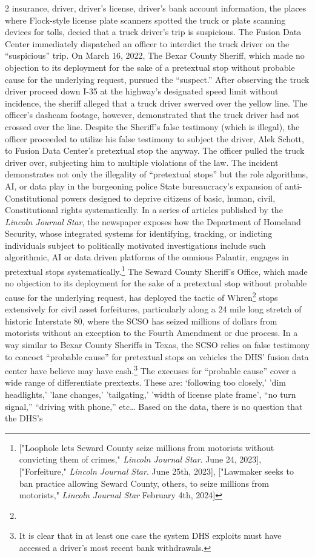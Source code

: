 \documentclass[10pt,a4paper,twoside]{article} %
\begin{document}
\begin{multicols}{2}
insurance, driver, driver’s license, driver’s bank account information, the places where Flock-style license plate scanners spotted the truck or plate scanning devices for tolls, decied that a truck driver’s trip is suspicious. The Fusion Data Center immediately dispatched an officer to interdict the truck driver on the “suspicious” trip. On March 16, 2022, The Bexar County Sheriff, which made no objection to its deployment for the sake of a pretextual stop without probable cause for the underlying request, pursued the “suspect.”  After observing the truck driver proceed down I-35 at the highway’s designated speed limit without incidence, the sheriff alleged that a truck driver swerved over the yellow line. The officer’s dashcam footage, however, demonstrated that the truck driver had not crossed over the line. Despite the Sheriff’s false testimony (which is illegal), the officer proceeded to utilize his false testimony to subject the driver, Alek Schott, to Fusion Data Center’s pretextual stop the anyway. The officer pulled the truck driver over, subjecting him to multiple violations of the law. The incident demonstrates not only the illegality of “pretextual stops” but the role algorithms, AI, or data play in the burgeoning police State bureaucracy’s expansion of anti-Constitutional powers designed to deprive citizens of basic, human, civil, Constitutional rights systematically. \newline \indent In a series of articles published by the \emph{Lincoln Journal Star}, the newspaper exposes how the Department of Homeland Security, whose integrated systems for identifying, tracking, or indicting individuals subject to politically motivated investigations include such algorithmic, AI or data driven platforms of the omnious Palantir, engages in pretextual stops systematically.\footnote{["Loophole lets Seward County seize millions from motorists without convicting them of crimes," \emph{Lincoln Journal Star}. June 24, 2023], ["Forfeiture," \emph{Lincoln Journal Star}. June 25th, 2023], ["Lawmaker seeks to ban practice allowing Seward County, others, to seize millions from motorists," \emph{Lincoln Journal Star} February 4th, 2024]} The Seward County Sheriff’s Office, which made no objection to its deployment for the sake of a pretextual stop without probable cause for the underlying request, has deployed the tactic of Whren\footnote{} stops extensively for civil asset forfeitures, particularly along a 24 mile long stretch of historic Interstate 80, where the SCSO has seized millions of dollars from motorists without an exception to the Fourth Amendment or due process. In a way similar to Bexar County Sheriffs in Texas, the SCSO relies on false testimony to concoct “probable cause” for pretextual stops on vehicles the DHS’ fusion data center have believe may have cash.\footnote{It is clear that in at least one case the system DHS exploits must have accessed a driver’s most recent bank withdrawals.} The execuses for “probable cause” cover a wide range of differentiate prextexts. These are: ‘following too closely,’ 'dim headlights,' 'lane changes,' 'tailgating,' 'width of license plate frame’,  “no turn signal,” “driving with phone,” etc… Based on the data, there is no question that the DHS’s 
\end{multicols}
\end{document}
